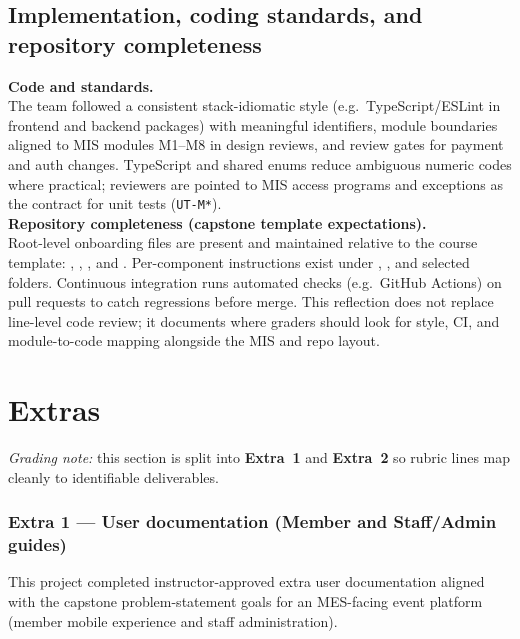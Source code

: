 \documentclass{article}
\begin{document}
\subsection{Implementation, coding standards, and repository completeness}

\noindent
\textbf{Code and standards.}\\
The team followed a consistent stack-idiomatic style (e.g.\ TypeScript/ESLint in frontend and backend packages)
with meaningful identifiers, module boundaries aligned to MIS modules M1--M8 in design reviews, and review gates for
payment and auth changes. TypeScript and shared enums reduce ambiguous numeric codes where practical;
reviewers are pointed to MIS access programs and exceptions as the contract for unit tests (\texttt{UT-M*}).\\

\noindent
\textbf{Repository completeness (capstone template expectations).}\\
Root-level onboarding files are present and maintained relative to the course template: ,
, , and . Per-component instructions exist under
, , and selected  folders.
Continuous integration runs automated checks (e.g.\ GitHub Actions) on pull requests to catch regressions before merge.
This reflection does not replace line-level code review; it documents where graders should look for style, CI, and
module-to-code mapping alongside the MIS and repo layout.

\section{Extras}

\noindent\textit{Grading note:} this section is split into \textbf{Extra~1} and \textbf{Extra~2} so rubric lines map cleanly to identifiable deliverables.

\subsubsection*{Extra 1 --- User documentation (Member and Staff/Admin guides)}

This project completed instructor-approved extra user documentation aligned with the capstone problem-statement
goals for an MES-facing event platform (member mobile experience and staff administration).
\end{document}
